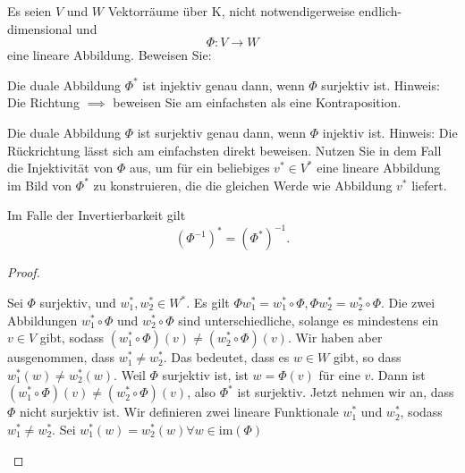 \begin{Problem}
	Es seien $V$ und $W$ Vektorräume über K, nicht notwendigerweise endlich-dimensional und
	\[
	\Phi:V\to W
	\]
	eine lineare Abbildung. Beweisen Sie:
	\begin{parts}
	\item Die duale Abbildung $\Phi^*$ ist injektiv genau dann, wenn $\Phi$ surjektiv ist.
		{\footnotesize Hinweis: Die Richtung $\implies$ beweisen Sie am einfachsten als eine Kontraposition.}
	\item Die duale Abbildung $\Phi$ ist surjektiv genau dann, wenn $\Phi$ injektiv ist.
		{\footnotesize Hinweis: Die Rückrichtung lässt sich am einfachsten direkt beweisen. Nutzen Sie in dem Fall die Injektivität von $\Phi$ aus, um f\"{u}r ein beliebiges $v^*\in V^*$ eine lineare Abbildung im Bild von $\Phi^*$ zu konstruieren, die die gleichen Werde wie Abbildung $v^*$ liefert.}
	\item Im Falle der Invertierbarkeit gilt
		\[
			\left( \Phi^{-1} \right) ^*=\left( \Phi^* \right) ^{-1}
		.\] 
	\end{parts}
\end{Problem}
\begin{proof}
	\begin{parts}
	\item Sei $\Phi$ surjektiv, und $w_1^*,w_2^*\in W^*$. Es gilt $\Phi w_1^*=w_1^*\circ \Phi, \Phi w_2^*=w_2^*\circ \Phi$. Die zwei Abbildungen  $w_1^*\circ \Phi$ und $w_2^*\circ \Phi$ sind unterschiedliche, solange es mindestens ein $v\in V$ gibt, sodass $(w_1^*\circ\Phi)(v)\neq (w_2^*\circ\Phi)(v)$. Wir haben aber ausgenommen, dass $w_1^*\neq w_2^*$. Das bedeutet, dass es $w\in W$ gibt, so dass $w_1^*(w)\neq w_2^*(w)$. Weil $\Phi$ surjektiv ist, ist $w=\Phi(v)$ f\"{u}r eine $v$. Dann ist $(w_1^*\circ\Phi)(v)\neq (w_2^*\circ\Phi)(v)$, also  $\Phi^*$ ist surjektiv. 
		Jetzt nehmen wir an, dass $\Phi$ nicht surjektiv ist. Wir definieren zwei lineare Funktionale $w_1^*$ und $w_2^*$, sodass $w_1^*\neq w_2^*$. Sei $w_1^*(w)=w_2^*(w)\forall w\in\text{im}(\Phi)$ 
	\end{parts}
\end{proof}
